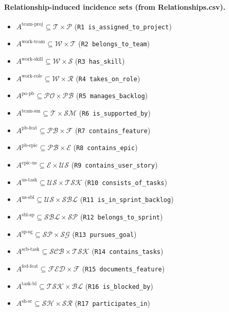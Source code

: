 \documentclass[11pt,a4paper]{article}
\begin{document}
\paragraph{Relationship-induced incidence sets (from Relationships.csv).}
\begin{itemize}
  \item $A^{\text{team-proj}} \subseteq \mathcal{T}\times\mathcal{P}$ (\texttt{R1 is\_assigned\_to\_project})
  \item $A^{\text{work-team}} \subseteq \mathcal{W}\times\mathcal{T}$ (\texttt{R2 belongs\_to\_team})
  \item $A^{\text{work-skill}} \subseteq \mathcal{W}\times\mathcal{S}$ (\texttt{R3 has\_skill})
  \item $A^{\text{work-role}} \subseteq \mathcal{W}\times\mathcal{R}$ (\texttt{R4 takes\_on\_role})
  \item $A^{\text{po-pb}} \subseteq \mathcal{PO}\times\mathcal{PB}$ (\texttt{R5 manages\_backlog})
  \item $A^{\text{team-sm}} \subseteq \mathcal{T}\times\mathcal{SM}$ (\texttt{R6 is\_supported\_by})
  \item $A^{\text{pb-feat}} \subseteq \mathcal{PB}\times\mathcal{F}$ (\texttt{R7 contains\_feature})
  \item $A^{\text{pb-epic}} \subseteq \mathcal{PB}\times\mathcal{E}$ (\texttt{R8 contains\_epic})
  \item $A^{\text{epic-us}} \subseteq \mathcal{E}\times\mathcal{US}$ (\texttt{R9 contains\_user\_story})
  \item $A^{\text{us-task}} \subseteq \mathcal{US}\times\mathcal{TSK}$ (\texttt{R10 consists\_of\_tasks})
  \item $A^{\text{us-sbl}} \subseteq \mathcal{US}\times\mathcal{SBL}$ (\texttt{R11 is\_in\_sprint\_backlog})
  \item $A^{\text{sbl-sp}} \subseteq \mathcal{SBL}\times\mathcal{SP}$ (\texttt{R12 belongs\_to\_sprint})
  \item $A^{\text{sp-sg}} \subseteq \mathcal{SP}\times\mathcal{SG}$ (\texttt{R13 pursues\_goal})
  \item $A^{\text{scb-task}} \subseteq \mathcal{SCB}\times\mathcal{TSK}$ (\texttt{R14 contains\_tasks})
  \item $A^{\text{fed-feat}} \subseteq \mathcal{FED}\times\mathcal{F}$ (\texttt{R15 documents\_feature})
  \item $A^{\text{task-bl}} \subseteq \mathcal{TSK}\times\mathcal{BL}$ (\texttt{R16 is\_blocked\_by})
  \item $A^{\text{sh-sr}} \subseteq \mathcal{SH}\times\mathcal{SR}$ (\texttt{R17 participates\_in})

\end{itemize}
\end{document}
